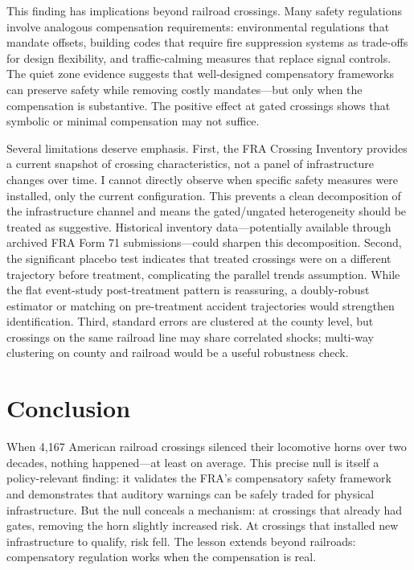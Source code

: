 \documentclass[12pt]{article}
\begin{document}
This finding has implications beyond railroad crossings. Many safety regulations involve analogous compensation requirements: environmental regulations that mandate offsets, building codes that require fire suppression systems as trade-offs for design flexibility, and traffic-calming measures that replace signal controls. The quiet zone evidence suggests that well-designed compensatory frameworks can preserve safety while removing costly mandates---but only when the compensation is substantive. The positive effect at gated crossings shows that symbolic or minimal compensation may not suffice.

Several limitations deserve emphasis. First, the FRA Crossing Inventory provides a current snapshot of crossing characteristics, not a panel of infrastructure changes over time. I cannot directly observe when specific safety measures were installed, only the current configuration. This prevents a clean decomposition of the infrastructure channel and means the gated/ungated heterogeneity should be treated as suggestive. Historical inventory data---potentially available through archived FRA Form 71 submissions---could sharpen this decomposition. Second, the significant placebo test indicates that treated crossings were on a different trajectory before treatment, complicating the parallel trends assumption. While the flat event-study post-treatment pattern is reassuring, a doubly-robust estimator or matching on pre-treatment accident trajectories would strengthen identification. Third, standard errors are clustered at the county level, but crossings on the same railroad line may share correlated shocks; multi-way clustering on county and railroad would be a useful robustness check.

\section{Conclusion}

When 4,167 American railroad crossings silenced their locomotive horns over two decades, nothing happened---at least on average. This precise null is itself a policy-relevant finding: it validates the FRA's compensatory safety framework and demonstrates that auditory warnings can be safely traded for physical infrastructure. But the null conceals a mechanism: at crossings that already had gates, removing the horn slightly increased risk. At crossings that installed new infrastructure to qualify, risk fell. The lesson extends beyond railroads: compensatory regulation works when the compensation is real.
\end{document}
